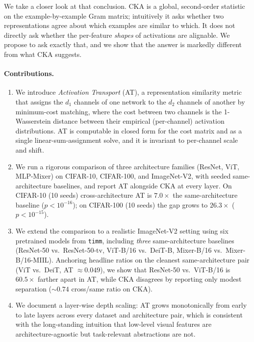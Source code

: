 \documentclass[11pt]{article}
\begin{document}
We take a closer look at that conclusion. CKA is a global, second-order
statistic on the example-by-example Gram matrix; intuitively it asks
whether two representations agree about which examples are similar to
which. It does not directly ask whether the per-feature \emph{shapes}
of activations are alignable. We propose to ask exactly that, and we
show that the answer is markedly different from what CKA suggests.

\paragraph{Contributions.}
\begin{enumerate}
\item We introduce \emph{Activation Transport} (AT), a representation
similarity metric that assigns the $d_1$ channels of one network to the
$d_2$ channels of another by minimum-cost matching, where the cost
between two channels is the 1-Wasserstein distance between their
empirical (per-channel) activation distributions. AT is computable in
closed form for the cost matrix and as a single linear-sum-assignment
solve, and it is invariant to per-channel scale and shift.
\item We run a rigorous comparison of three architecture families
(ResNet, ViT, MLP-Mixer) on CIFAR-10, CIFAR-100, and ImageNet-V2, with
seeded same-architecture baselines, and report AT alongside CKA at every
layer. On CIFAR-10 (10 seeds) cross-architecture AT is $7.0\times$ the
same-architecture baseline ($p<10^{-16}$); on CIFAR-100 (10 seeds) the
gap grows to $26.3\times$ ($p<10^{-15}$).
\item We extend the comparison to a realistic ImageNet-V2 setting using
six pretrained models from \texttt{timm}, including \emph{three}
same-architecture baselines (ResNet-50 vs.\ ResNet-50-tv, ViT-B/16 vs.\
DeiT-B, Mixer-B/16 vs.\ Mixer-B/16-MIIL). Anchoring headline ratios on
the cleanest same-architecture pair (ViT vs.\ DeiT, AT $\approx 0.049$),
we show that ResNet-50 vs.\ ViT-B/16 is $60.5\times$ farther apart in
AT, while CKA disagrees by reporting only modest separation
($\sim 0.74$ cross/same ratio on CKA).
\item We document a layer-wise depth scaling: AT grows monotonically
from early to late layers across every dataset and architecture pair,
which is consistent with the long-standing intuition that low-level
visual features are architecture-agnostic but task-relevant
abstractions are not.
\end{enumerate}
\end{document}
